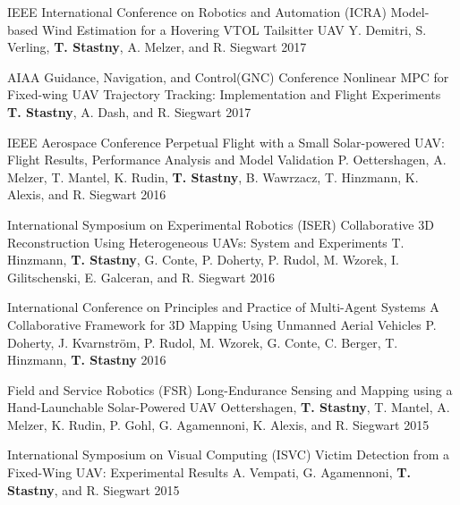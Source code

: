 \begin{cventries}
\cvpubentry
	{IEEE International Conference on Robotics and Automation (ICRA)} %
	{Model-based Wind Estimation for a Hovering VTOL Tailsitter UAV} %
	{Y. Demitri, S. Verling, \textbf{T. Stastny}, A. Melzer, and R. Siegwart} %
	{} %
	{2017} %
	{} %
	{} %
		
\cvpubentry
	{AIAA Guidance, Navigation, and Control(GNC) Conference} %
	{Nonlinear MPC for Fixed-wing UAV Trajectory Tracking: Implementation and Flight Experiments} %
	{\textbf{T. Stastny}, A. Dash, and R. Siegwart} %
	{} %
	{2017} %
	{} %
	{} %

\cvpubentry
	{IEEE Aerospace Conference} %
	{Perpetual Flight with a Small Solar-powered UAV: Flight Results, Performance Analysis and Model Validation} %
	{P. Oettershagen, A. Melzer, T. Mantel, K. Rudin, \textbf{T. Stastny}, B. Wawrzacz, T. Hinzmann, K. Alexis, and R. Siegwart} %
	{} %
	{2016} %
	{} %
	{} %


\cvpubentry
	{International Symposium on Experimental Robotics (ISER)} %
	{Collaborative 3D Reconstruction Using Heterogeneous UAVs: System and Experiments} %
	{T. Hinzmann, \textbf{T. Stastny}, G. Conte, P. Doherty, P. Rudol, M. Wzorek, I. Gilitschenski, E. Galceran, and R. Siegwart} %
	{} %
	{2016} %
	{} %
	{} %

\cvpubentry
	{International Conference on Principles and Practice of Multi-Agent Systems} %
	{A Collaborative Framework for 3D Mapping Using Unmanned Aerial Vehicles} %
	{P. Doherty, J. Kvarnstr{\"o}m, P. Rudol, M. Wzorek, G. Conte, C. Berger, T. Hinzmann, \textbf{T. Stastny}} %
	{} %
	{2016} %
	{} %
	{} %

\cvpubentry
	{Field and Service Robotics (FSR)} %
	{Long-Endurance Sensing and Mapping using a Hand-Launchable Solar-Powered UAV} %
	{Oettershagen, \textbf{T. Stastny}, T. Mantel, A. Melzer, K. Rudin, P. Gohl, G. Agamennoni, K. Alexis, and R. Siegwart} %
	{} %
	{2015} %
	{} %
	{} %

\cvpubentry
	{International Symposium on Visual Computing (ISVC)} %
	{Victim Detection from a Fixed-Wing UAV: Experimental Results} %
	{A. Vempati, G. Agamennoni, \textbf{T. Stastny}, and R. Siegwart} %
	{} %
	{2015} %
	{} %
	{} %
	

\end{cventries}
